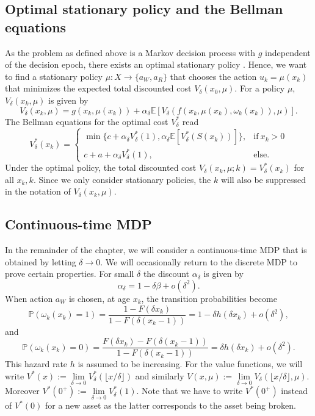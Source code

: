 \subsection{Optimal stationary policy and the Bellman equations}
As the problem as defined above is a Markov decision process with $g$ independent of the decision epoch, there exists an optimal stationary policy \cite{Puterman2008}.
Hence, we want to find a stationary policy $\mu:X\rightarrow \{a_W,a_R\}$ that chooses the action $u_k=\mu(x_k)$ that minimizes the expected total discounted cost $V_\delta(x_0,\mu)$.
For a policy $\mu$, $V_\delta(x_k,\mu)$ is given by
$$
V_\delta(x_k,\mu)=g(x_k,\mu(x_k))+\alpha_\delta \mathbb{E}[V_\delta(f(x_k,\mu(x_k),\omega_k(x_k)),\mu)].
$$
The Bellman equations for the optimal cost $V^*_\delta$ read
\begin{equation}\label{eq:AgeBasedBellman}
V^*_\delta(x_k)=\begin{cases}
\min\{c+\alpha_\delta V^*_\delta(1),\alpha_\delta \mathbb{E}[V^*_\delta(S(x_k))]\},&\text{if}\ x_k>0 \\
c+a+\alpha_\delta V^*_\delta(1),&\text{else.}
\end{cases}
\end{equation}
Under the optimal policy, the total discounted cost $V_\delta(x_k,\mu;k)=V^*_\delta(x_k)$ for all $x_k,k$.
Since we only consider stationary policies, the $k$ will also be suppressed in the notation of $V_\delta(x_k,\mu)$.

\subsection{Continuous-time MDP}
In the remainder of the chapter, we will consider a continuous-time MDP that is obtained by letting $\delta\rightarrow0$.
We will occasionally return to the discrete MDP to prove certain properties.
For small $\delta$ the discount $\alpha_\delta$ is given by
\[
\alpha_\delta=1-\delta\beta+o(\delta^2).
\]
When action $a_W$ is chosen, at age $x_k$, the transition probabilities become
$$
\mathbb{P}(\omega_k(x_k)=1)=\frac{1-F(\delta x_k)}{1-F(\delta (x_k-1))}=1-\delta h(\delta x_k)+o(\delta^2),
$$
and
\[
\mathbb{P}(\omega_k(x_k)=0)=\frac{F(\delta x_k)-F(\delta (x_k-1))}{1-F(\delta (x_k-1))}=\delta h(\delta x_k)+o(\delta^2).
\]
This hazard rate $h$ is assumed to be increasing.
For the value functions, we will write $V^*(x):=\lim\limits_{\delta\rightarrow0}V_\delta^*(\lfloor x/\delta\rfloor)$ and similarly $V(x,\mu):=\lim\limits_{\delta\rightarrow0}V_\delta(\lfloor x/\delta\rfloor,\mu)$.
Moreover $V^*(0^+):=\lim\limits_{\delta\rightarrow0}V_\delta^*(1)$.
Note that we have to write $V^*(0^+)$ instead of $V^*(0)$ for a new asset as the latter corresponds to the asset being broken.

